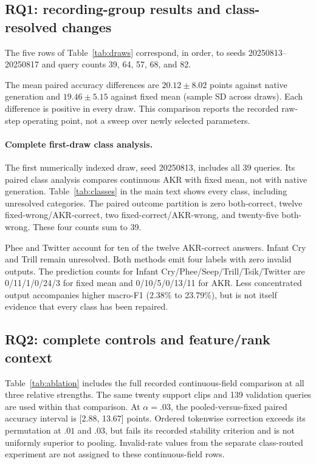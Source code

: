 \documentclass{article}
\begin{document}
\subsection{RQ1: recording-group results and class-resolved changes}
\label{app:rq1}
\label{app:repair_draws}
The five rows of Table~\ref{tab:draws} correspond, in order, to seeds 20250813--20250817 and query counts 39, 64, 57, 68, and 82.


The mean paired accuracy differences are $20.12\pm8.02$ points against native generation and $19.46\pm5.15$ against fixed mean (sample SD across draws). Each difference is positive in every draw. This comparison reports the recorded raw-step operating point, not a sweep over newly selected parameters.

\paragraph{Complete first-draw class analysis.}
\label{app:case}
\label{app:decisionchanges}
The first numerically indexed draw, seed 20250813, includes all 39 queries. Its paired class analysis compares continuous AKR with fixed mean, not with native generation. Table~\ref{tab:classes} in the main text shows every class, including unresolved categories. The paired outcome partition is zero both-correct, twelve fixed-wrong/AKR-correct, two fixed-correct/AKR-wrong, and twenty-five both-wrong. These four counts sum to 39.


Phee and Twitter account for ten of the twelve AKR-correct answers. Infant Cry and Trill remain unresolved. Both methods emit four labels with zero invalid outputs. The prediction counts for Infant Cry/Phee/Seep/Trill/Tsik/Twitter are 0/11/1/0/24/3 for fixed mean and 0/10/5/0/13/11 for AKR. Less concentrated output accompanies higher macro-F1 (2.38\% to 23.79\%), but is not itself evidence that every class has been repaired.

\subsection{RQ2: complete controls and feature/rank context}
\label{app:rq2}
Table~\ref{tab:ablation} includes the full recorded continuous-field comparison at all three relative strengths. The same twenty support clips and 139 validation queries are used within that comparison. At $\alpha=.03$, the pooled-versus-fixed paired accuracy interval is [2.88, 13.67] points. Ordered tokenwise correction exceeds its permutation at $.01$ and $.03$, but fails its recorded stability criterion and is not uniformly superior to pooling. Invalid-rate values from the separate class-routed experiment are not assigned to these continuous-field rows.
\end{document}
